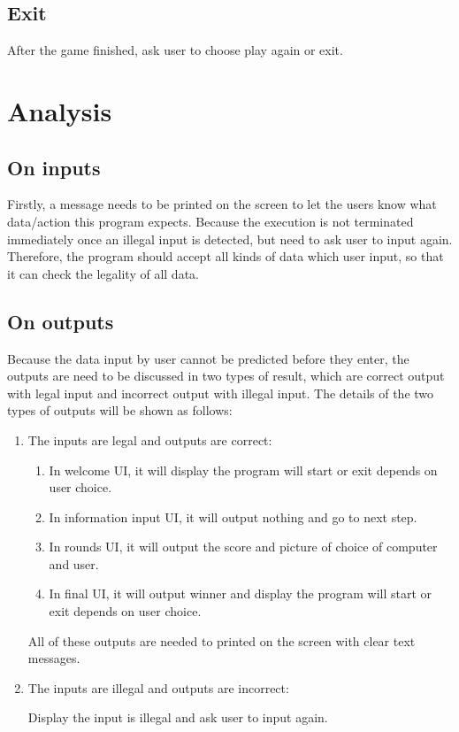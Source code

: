 \documentclass[12pt]{article}
\begin{document}
	\subsection{Exit}
	After the game finished, ask user to choose play again or exit.

	\section{Analysis}
	
	\subsection{On inputs}
	Firstly, a message needs to be printed on the screen to let the users know what data/action this program expects. Because the execution is not terminated immediately once an illegal input is detected, but need to ask user to input again. Therefore, the program should accept all kinds of data which user input, so that it can check the legality of all data.
	
	\subsection{On outputs}
	Because the data input by user cannot be predicted before they enter, the outputs are need to be discussed in two types of result, which are correct output with legal input and incorrect output with illegal input. The details of the two types of outputs will be shown as follows:
	
	\begin{enumerate}
		\item The inputs are legal and outputs are correct:
	
		\begin{enumerate}[1)]
			\item In welcome UI, it will display the program will start or exit depends on user choice.
			\item In information input UI, it will output nothing and go to next step.
			\item In rounds UI, it will output the score and picture of choice of computer and user.
			\item In final UI, it will output winner and display the program will start or exit depends on user choice.
		\end{enumerate}
		
		All of these outputs are needed to printed on the screen with clear text messages.
	
		\item The inputs are illegal and outputs are incorrect:
		
		Display the input is illegal and ask user to input again.
	\end{enumerate}
\end{document}
